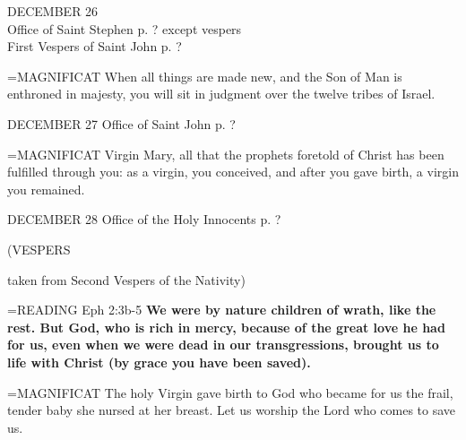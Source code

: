 \begin{center}\normalsize DECEMBER 26\\
\footnotesize Office of Saint Stephen p. ? except vespers\\
\footnotesize First Vespers of Saint John p. ?\\
\end{center}

\hangindent=\parindent \small{MAGNIFICAT 	When all things are made new, and the Son of Man is enthroned in majesty, you will sit in judgment over the twelve tribes of Israel.\\}

DECEMBER 27
Office of Saint John p. ?

\hangindent=\parindent \small{MAGNIFICAT 	Virgin Mary, all that the prophets foretold of Christ has been fulfilled through you: as a virgin, you conceived, and after you gave birth, a virgin you remained.\\}

DECEMBER 28
Office of the Holy Innocents p. ?
\begin{flushleft}\normalsize (VESPERS\\\end{flushleft} taken from Second Vespers of the Nativity)

\hangindent=\parindent \small{\uppercase{READING}}    Eph 2:3b-5 \textbf{   We were by nature children of wrath, like the rest. But God, who is rich in mercy, because of the great love he had for us, even when we were dead in our transgressions, brought us to life with Christ (by grace you have been saved).\\}

\hangindent=\parindent \small{MAGNIFICAT 	The holy Virgin gave birth to God who became for us the frail, tender baby she nursed at her breast. Let us worship the Lord who comes to save us.\\}
